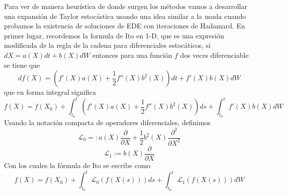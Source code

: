 \documentclass{article}
\begin{document}
\noindent
Para ver de manera heurística de donde surgen los métodos vamos a desarrollar una expansión de Taylor estocástica usando una idea similar a la usada cuando probamos la existencia de soluciones de EDE con iteraciones de Hadamard. En primer lugar, recordemos la formula de Ito en 1-D, que es una expresión modificada de la regla de la cadena para diferenciales estocáticos, si $dX=a(X)dt+b(X)dW$ entonces para una función $f$ dos veces diferenciable se tiene que
\begin{equation}
    df(X)=(f'(X)a(X)+\frac{1}{2}f''(X)b^2(X))dt + f'(X)b(X)dW
\end{equation}
que en forma integral significa 
\begin{equation}
    f(X)=f(X_0)+\int_{t_0}^{t} (f'(X)a(X)+\frac{1}{2}f''(X)b^2(X))ds + \int_{t_0}^{t}f'(X)b(X)dW
\end{equation}
\noindent
Usando la notación compacta de operadores diferenciales, definimos
\begin{equation}
    \mathcal{L}_0=:a(X)\frac{\partial}{\partial X} +\frac{1}{2}b^2(X)\frac{\partial^2}{\partial X^2} 
\end{equation}
\begin{equation}
    \mathcal{L}_1:=b(X)\frac{\partial}{\partial X}
\end{equation}
\noindent
Con los cuales la fórmula de Ito se escribe como 
\begin{equation}
\label{ito:integ}
    f(X)=f(X_0)+\int_{t_0}^{t} \mathcal{L}_0(f(X(s)))ds + \int_{t_0}^{t}\mathcal{L}_1(f(X(s)))dW
\end{equation}
\end{document}
